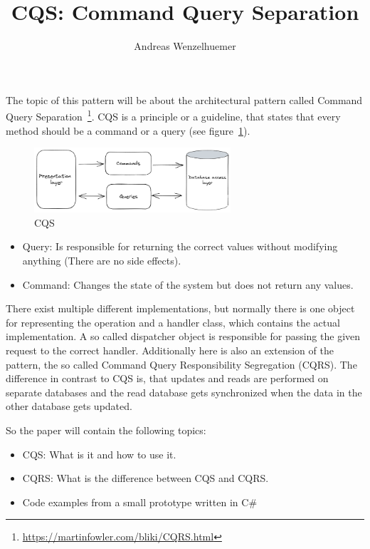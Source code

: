 \documentclass[11pt,a4paper,oneside]{article}
\title{CQS: Command Query Separation}
\author{Andreas Wenzelhuemer}
\begin{document}
\maketitle

The topic of this pattern will be about the architectural pattern called Command Query Separation~\footnote{\url{https://martinfowler.com/bliki/CQRS.html}}.
CQS is a principle or a guideline, that states that every method should be a command or a query (see figure~\ref{fig:cqs}).

\begin{figure}[h]
    \centering
    \includegraphics[width=0.65\textwidth]{images/CQS.png}
    \caption{CQS}
    \label{fig:cqs}
\end{figure}

\begin{itemize}
    \item {Query: Is responsible for returning the correct values without modifying anything (There are no side effects).}
    \item {Command: Changes the state of the system but does not return any values.}
\end{itemize}

There exist multiple different implementations, but normally there is one object for representing the operation and a handler class, which contains the actual implementation.
A so called dispatcher object is responsible for passing the given request to the correct handler.
Additionally here is also an extension of the pattern, the so called Command Query Responsibility Segregation (CQRS).
The difference in contrast to CQS is, that updates and reads are performed on separate databases and the read database gets synchronized when the data in the other database gets updated.

So the paper will contain the following topics:
\begin{itemize}
    \item {CQS: What is it and how to use it.}
    \item {CQRS: What is the difference between CQS and CQRS.}
    \item {Code examples from a small prototype written in C\#}
\end{itemize}
\end{document}
